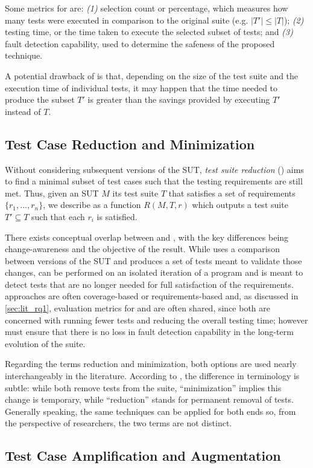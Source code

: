 Some metrics for \tcs are: \textit{(1)} selection count or percentage, which measures how many tests were executed in comparison to the original suite (e.g. $|T'| \leq |T|$); \textit{(2)} testing time, or the time taken to execute the selected subset of tests; and \textit{(3)} fault detection capability, used to determine the safeness of the proposed technique.

A potential drawback of \tcs is that, depending on the size of the test suite and the execution time of individual tests, it may happen that the time needed to produce the subset $T'$ is greater than the savings provided by executing $T'$ instead of $T$. 

\subsection{Test Case Reduction and Minimization}
\label{sec:tsr}

Without considering subsequent versions of the SUT, \textit{test suite reduction} (\tsr) aims to find a minimal subset of test cases such that the testing requirements are still met.
Thus, given an SUT $M$ its test suite $T$ that satisfies a set of requirements $\{r_1, ..., r_n\}$, we describe \tsr as a function $R(M, T, r)$ which outputs a test suite $T' \subseteq T$ such that each $r_i$ is satisfied.

There exists conceptual overlap between \tcs and \tsr, with the key differences being change-awareness and the objective of the result.
While \tcs uses a comparison between versions of the SUT and produces a set of tests meant to validate those changes, \tsr can be performed on an isolated iteration of a program and is meant to detect tests that are no longer needed for full satisfaction of the requirements.
\tsr approaches are often coverage-based or requirements-based and, as discussed in \autoref{sec:lit_rq1}, evaluation metrics for \tcp and \tsr are often shared, since both are concerned with running fewer tests and reducing the overall testing time; however \tsr must ensure that there is no loss in fault detection capability in the long-term evolution of the suite.

Regarding the terms reduction and minimization, both options are used nearly interchangeably in the literature.
According to \citeauthor{yoo2012regression}, the difference in terminology is subtle: while both remove tests from the suite, ``minimization'' implies this change is temporary, while ``reduction'' stands for permanent removal of tests.
Generally speaking, the same techniques can be applied for both ends so, from the perspective of researchers, the two terms are not distinct.

\subsection{Test Case Amplification and Augmentation}\label{sec:tsa}
